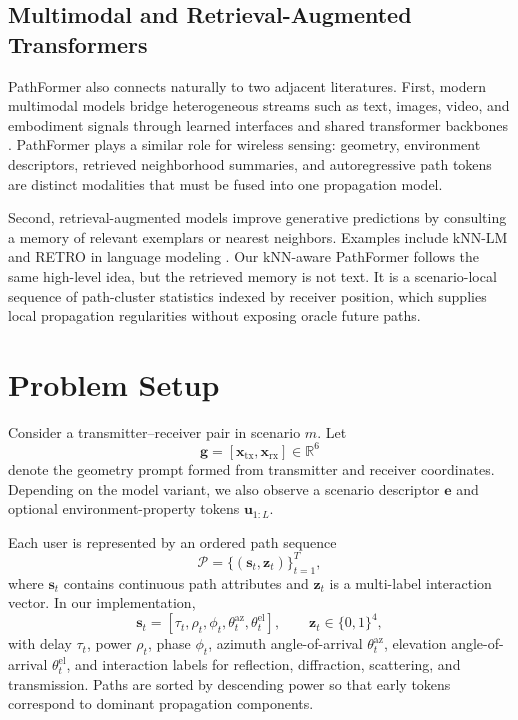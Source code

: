 \documentclass[11pt]{article}
\begin{document}
\subsection{Multimodal and Retrieval-Augmented Transformers}
PathFormer also connects naturally to two adjacent literatures. First, modern multimodal models bridge heterogeneous streams such as text, images, video, and embodiment signals through learned interfaces and shared transformer backbones \cite{flamingo,blip2,palme}. PathFormer plays a similar role for wireless sensing: geometry, environment descriptors, retrieved neighborhood summaries, and autoregressive path tokens are distinct modalities that must be fused into one propagation model.

Second, retrieval-augmented models improve generative predictions by consulting a memory of relevant exemplars or nearest neighbors. Examples include kNN-LM and RETRO in language modeling \cite{knnlm,retro}. Our kNN-aware PathFormer follows the same high-level idea, but the retrieved memory is not text. It is a scenario-local sequence of path-cluster statistics indexed by receiver position, which supplies local propagation regularities without exposing oracle future paths.

\section{Problem Setup}
Consider a transmitter--receiver pair in scenario $m$. Let
\begin{equation}
\mathbf{g} = [\mathbf{x}_{\mathrm{tx}}, \mathbf{x}_{\mathrm{rx}}] \in \mathbb{R}^{6}
\end{equation}
denote the geometry prompt formed from transmitter and receiver coordinates. Depending on the model variant, we also observe a scenario descriptor $\mathbf{e}$ and optional environment-property tokens $\mathbf{u}_{1:L}$.

Each user is represented by an ordered path sequence
\begin{equation}
\mathcal{P} = \{(\mathbf{s}_t,\mathbf{z}_t)\}_{t=1}^{T},
\end{equation}
where $\mathbf{s}_t$ contains continuous path attributes and $\mathbf{z}_t$ is a multi-label interaction vector. In our implementation,
\begin{equation}
\mathbf{s}_t =
[\tau_t,\rho_t,\phi_t,\theta_t^{\mathrm{az}},\theta_t^{\mathrm{el}}],
\qquad
\mathbf{z}_t \in \{0,1\}^{4},
\end{equation}
with delay $\tau_t$, power $\rho_t$, phase $\phi_t$, azimuth angle-of-arrival $\theta_t^{\mathrm{az}}$, elevation angle-of-arrival $\theta_t^{\mathrm{el}}$, and interaction labels for reflection, diffraction, scattering, and transmission. Paths are sorted by descending power so that early tokens correspond to dominant propagation components.
\end{document}
